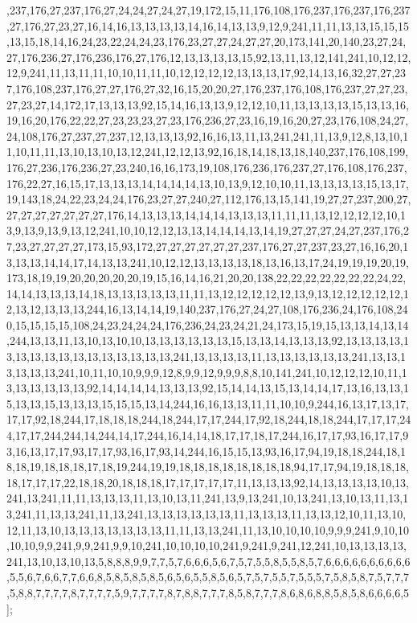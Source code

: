 ,237,176,27,237,176,27,24,24,27,24,27,19,172,15,11,176,108,176,237,176,237,176,237,27,176,27,23,27,16,14,16,13,13,13,13,14,16,14,13,13,9,12,9,241,11,11,13,13,15,15,15,13,15,18,14,16,24,23,22,24,24,23,176,23,27,27,24,27,27,20,173,141,20,140,23,27,24,27,176,236,27,176,236,176,27,176,12,13,13,13,13,15,92,13,11,13,12,141,241,10,12,12,12,9,241,11,13,11,11,10,10,11,11,10,12,12,12,12,13,13,13,17,92,14,13,16,32,27,27,237,176,108,237,176,27,27,176,27,32,16,15,20,20,27,176,237,176,108,176,237,27,27,23,27,23,27,14,172,17,13,13,13,92,15,14,16,13,13,9,12,12,10,11,13,13,13,13,15,13,13,16,19,16,20,176,22,22,27,23,23,23,27,23,176,236,27,23,16,19,16,20,27,23,176,108,24,27,24,108,176,27,237,27,237,12,13,13,13,92,16,16,13,11,13,241,241,11,13,9,12,8,13,10,11,10,11,11,13,10,13,10,13,12,241,12,12,13,92,16,18,14,18,13,18,140,237,176,108,199,176,27,236,176,236,27,23,240,16,16,173,19,108,176,236,176,237,27,176,108,176,237,176,22,27,16,15,17,13,13,13,14,14,14,14,13,10,13,9,12,10,10,11,13,13,13,13,15,13,17,19,143,18,24,22,23,24,24,176,23,27,27,240,27,112,176,13,15,141,19,27,27,237,200,27,27,27,27,27,27,27,27,176,14,13,13,13,14,14,14,13,13,13,11,11,11,13,12,12,12,12,10,13,9,13,9,13,9,13,12,241,10,10,12,12,13,13,14,14,14,13,14,19,27,27,27,24,27,237,176,27,23,27,27,27,27,173,15,93,172,27,27,27,27,27,27,237,176,27,27,237,23,27,16,16,20,13,13,13,14,14,17,14,13,13,241,10,12,12,13,13,13,13,18,13,16,13,17,24,19,19,19,20,19,173,18,19,19,20,20,20,20,20,19,15,16,14,16,21,20,20,138,22,22,22,22,22,22,22,24,22,14,14,13,13,13,14,18,13,13,13,13,13,11,11,13,12,12,12,12,12,13,9,13,12,12,12,12,12,12,13,12,13,13,13,244,16,13,14,14,19,140,237,176,27,24,27,108,176,236,24,176,108,240,15,15,15,15,108,24,23,24,24,24,176,236,24,23,24,21,24,173,15,19,15,13,13,14,13,14,244,13,13,11,13,10,13,10,10,13,13,13,13,13,13,15,13,13,14,13,13,13,92,13,13,13,13,13,13,13,13,13,13,13,13,13,13,13,13,241,13,13,13,13,11,13,13,13,13,13,13,241,13,13,13,13,13,13,241,10,11,10,10,9,9,9,12,8,9,9,12,9,9,9,8,8,10,141,241,10,12,12,12,10,11,13,13,13,13,13,13,92,14,14,14,14,13,13,13,92,15,14,14,13,15,13,14,14,17,13,16,13,13,15,13,13,15,13,13,13,15,15,15,13,14,244,16,16,13,13,11,11,10,10,9,244,16,13,17,13,17,17,17,92,18,244,17,18,18,18,244,18,244,17,17,244,17,92,18,244,18,18,244,17,17,17,244,17,17,244,244,14,244,14,17,244,16,14,14,18,17,17,18,17,244,16,17,17,93,16,17,17,93,16,13,17,17,93,17,17,93,16,17,93,14,244,16,15,15,13,93,16,17,94,19,18,18,244,18,18,18,19,18,18,18,17,18,19,244,19,19,18,18,18,18,18,18,18,18,94,17,17,94,19,18,18,18,18,17,17,17,22,18,18,20,18,18,18,17,17,17,17,17,11,13,13,13,92,14,13,13,13,13,10,13,241,13,241,11,11,13,13,13,11,13,10,13,11,241,13,9,13,241,10,13,241,13,10,13,11,13,13,241,11,13,13,241,11,13,241,13,13,13,13,13,13,11,13,13,13,11,13,13,12,10,11,13,10,12,11,13,10,13,13,13,13,13,13,13,11,11,13,13,241,11,13,10,10,10,10,9,9,9,241,9,10,10,10,10,9,9,241,9,9,241,9,9,10,241,10,10,10,10,241,9,241,9,241,12,241,10,13,13,13,13,241,13,10,13,10,13,5,8,8,8,9,9,7,7,5,7,6,6,6,5,6,7,5,7,5,5,8,5,5,8,5,7,6,6,6,6,6,6,6,6,6,6,5,5,6,7,6,6,7,7,6,6,8,5,8,5,8,5,8,5,6,5,6,5,5,8,5,6,5,7,5,7,5,5,7,5,5,5,7,5,8,5,8,7,5,7,7,7,5,8,8,7,7,7,7,8,7,7,7,7,5,9,7,7,7,7,8,7,8,8,7,7,7,8,5,8,7,7,7,8,6,8,6,8,8,5,8,5,8,6,6,6,6,5];

